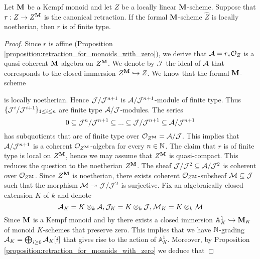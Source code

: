 \begin{theorem}\label{theorem:if_formal_neighborhood_is_locally_noetherian_then_canonical_retraction_is_of_finite_type}
Let $\mathbf{M}$ be a Kempf monoid and let $Z$ be a locally linear $\mathbf{M}$-scheme. Suppose that $r:Z\rightarrow Z^{\mathbf{M}}$ is the canonical retraction. If the formal $\mathbf{M}$-scheme $\widehat{Z}$ is locally noetherian, then $r$ is of finite type.
\end{theorem}
\begin{proof}
Since $r$ is affine (Proposition \ref{proposition:retraction_for_monoids_with_zero}), we derive that ${\mathcal A} = r_*{\mathcal O}_Z$ is a quasi-coherent $\mathbf{M}$-algebra on $Z^{\mathbf{M}}$. We denote by ${\mathcal J}$ the ideal of ${\mathcal A}$ that corresponds to the closed immersion $Z^{\mathbf{M}}\hookrightarrow Z$. We know that the formal $\mathbf{M}$-scheme
\begin{center}
\end{center}
is locally noetherian. Hence ${\mathcal J}/{\mathcal J}^{n+1}$ is ${\mathcal A}/{\mathcal J}^{n+1}$-module of finite type. Thus $\{{\mathcal J}^i/{\mathcal J}^{i+1}\}_{1\leq i\leq n}$ are finite type ${\mathcal A}/{\mathcal J}$-modules. The series
$$0 \subseteq {\mathcal J}^n/{\mathcal J}^{n+1} \subseteq  ... \subseteq {\mathcal J}/{\mathcal J}^{n+1} \subseteq {\mathcal A}/{\mathcal J}^{n+1}$$
has subquotients that are of finite type over ${\mathcal O}_{Z^{\mathbf{M}}} = {\mathcal A}/{\mathcal J}$. This implies that ${\mathcal A}/{\mathcal J}^{n+1}$ is a coherent ${\mathcal O}_{Z^{\mathbf{M}}}$-algebra for every $n\in {\mathbb N}$. The claim that $r$ is of finite type is local on $Z^{\mathbf{M}}$, hence we may assume that $Z^{\mathbf{M}}$ is quasi-compact. This reduces the question to the noetherian $Z^{\mathbf{M}}$. The sheaf ${\mathcal J}/{\mathcal J}^2\subseteq {\mathcal A}/{\mathcal J}^2$ is coherent over ${\mathcal O}_{Z^{\mathbf{M}}}$. Since $Z^{\mathbf{M}}$ is noetherian, there exists coherent ${\mathcal O}_{Z^{\mathbf{M}}}$-subsheaf ${\mathcal M}\subseteq {\mathcal J}$ such that the morphism ${\mathcal M}\twoheadrightarrow {\mathcal J}/{\mathcal J}^2$ is surjective. Fix an algebraically closed extension $K$ of $k$ and denote
$${\mathcal A}_K = K\otimes_k{\mathcal A},{\mathcal J}_K = K\otimes_k{\mathcal J},{\mathcal M}_K = K\otimes_k{\mathcal M}$$
Since $\mathbf{M}$ is a Kempf monoid and by {\cite[Corollary 3.7]{Algebraic_monoids}} there exists a closed immersion $\mathbb{A}^1_K\hookrightarrow \mathbf{M}_K$ of monoid $K$-schemes that preserve zero. This implies that we have ${\mathbb N}$-grading ${\mathcal A}_K = \bigoplus_{i\geq 0}{\mathcal A}_K[i]$ that gives rise to the action of $\mathbb{A}^1_K$. Moreover, by Proposition \ref{proposition:retraction_for_monoids_with_zero} we deduce that

\end{proof}
